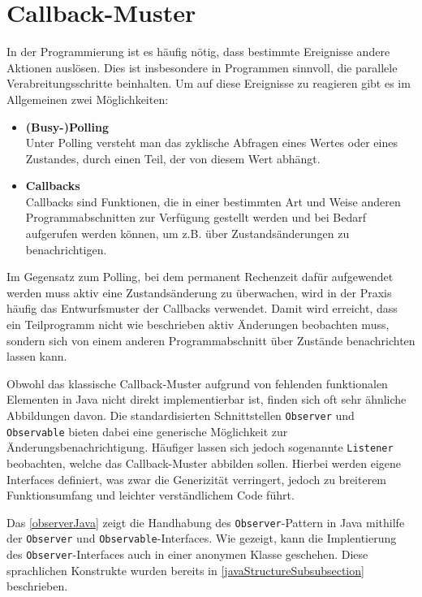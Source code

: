 \section{Callback-Muster}
In der Programmierung ist es häufig nötig, dass bestimmte Ereignisse andere Aktionen auslösen. Dies ist insbesondere in Programmen sinnvoll, die parallele Verabreitungsschritte beinhalten. Um auf diese Ereignisse zu reagieren gibt es im Allgemeinen zwei Möglichkeiten: 

\begin{itemize}
    \item \textbf{(Busy-)Polling}\\
    Unter Polling versteht man das zyklische Abfragen eines Wertes oder eines Zustandes, durch einen Teil, der von diesem Wert abhängt.
    \item \textbf{Callbacks}\\
    Callbacks sind Funktionen, die in einer bestimmten Art und Weise anderen Programmabschnitten zur Verfügung gestellt werden und bei Bedarf aufgerufen werden können, um z.B. über Zustandsänderungen zu benachrichtigen.
\end{itemize}

Im Gegensatz zum Polling, bei dem permanent Rechenzeit dafür aufgewendet werden muss aktiv eine Zustandsänderung zu überwachen, wird in der Praxis häufig das Entwurfsmuster der Callbacks verwendet. Damit wird erreicht, dass ein Teilprogramm nicht wie beschrieben aktiv Änderungen beobachten muss, sondern sich von einem anderen Programmabschnitt über Zustände benachrichten lassen kann. 

Obwohl das klassische Callback-Muster aufgrund von fehlenden funktionalen Elementen in Java nicht direkt implementierbar ist, finden sich oft sehr ähnliche Abbildungen davon. Die standardisierten Schnittstellen  \texttt{Observer} und \texttt{Observable} bieten dabei eine generische Möglichkeit zur Änderungsbenachrichtigung. Häufiger lassen sich jedoch sogenannte \texttt{Listener} beobachten, welche das Callback-Muster abbilden sollen. Hierbei werden eigene Interfaces definiert, was zwar die Generizität verringert, jedoch zu breiterem Funktionsumfang und leichter verständlichem Code führt.

Das \autoref{observerJava} zeigt die Handhabung des \texttt{Observer}-Pattern \cite{gamma_design_1995} in Java mithilfe der \texttt{Observer} und \texttt{Observable}-Interfaces. Wie gezeigt, kann die Implentierung des \texttt{Observer}-Interfaces auch in einer anonymen Klasse geschehen. Diese sprachlichen Konstrukte wurden bereits in \autoref{javaStructureSubsubsection} beschrieben. 

